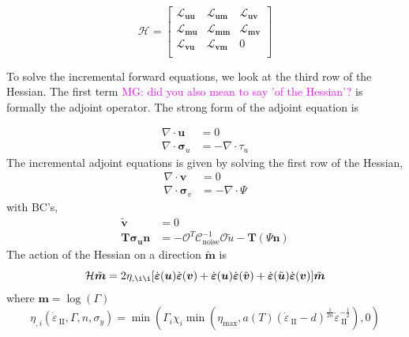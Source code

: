 \documentclass[12pt]{article}
\newcommand{\mgnote}[1]{\textcolor{magenta}{MG: #1}}
\newcommand{\IIinv}{{\dot\varepsilon}_{\mathrm{\!\!\:II}}}
\newcommand{\mm}{{\ensuremath{\boldsymbol{m}}}}
\newcommand{\uu}{{\ensuremath{\boldsymbol{u}}}}
\newcommand{\vv}{{\ensuremath{\boldsymbol{v}}}}
\newcommand{\ssigma}{{\ensuremath{\boldsymbol{\sigma}}}}
\newcommand{\strain}{{\ensuremath{\dot{\boldsymbol{\varepsilon}}}}}
\begin{document}
\begin{equation}
\mathcal{H} = 
\begin{bmatrix}
\mathcal{L}_{\uu\uu} & \mathcal{L}_{\uu\mm} & \mathcal{L}_{\uu\vv} \\
\mathcal{L}_{\mm\uu} & \mathcal{L}_{\mm\mm} & \mathcal{L}_{\mm\vv} \\
\mathcal{L}_{\vv\uu} & \mathcal{L}_{\vv\mm} & 0 \\
\end{bmatrix}
\end{equation}


To solve the incremental forward equations, we look at the third row of the Hessian. The first term \mgnote{did you also mean to say 'of the Hessian'?} is formally the adjoint operator. The strong form of the adjoint equation is 

\begin{equation}
\begin{split}
\nabla \cdot \uu &= 0 \\
\nabla \cdot \ssigma_u & = -\nabla \cdot \tau_u
\end{split}
\end{equation}
The incremental adjoint equations is given by solving the first row of the Hessian,
\begin{equation}
\begin{split}
\nabla \cdot \vv & = 0\\
\nabla \cdot \ssigma_v & = -\nabla \cdot \Psi 
\end{split}
\end{equation}
with BC's,
\begin{equation}
\begin{split}
\tilde{\vv}&=0 \\
\textbf{T}\ssigma_\uu\textbf{n}&= -\mathcal O^T\mathcal C^{-1}_{\text{noise}}\mathcal O \tilde{u}-\textbf{T}(\Psi\textbf{n})
\end{split}
\end{equation}
The action of the Hessian on a direction $\tilde{\mm}$ is
\begin{equation}
\mathcal H\tilde{\mm}= 2\eta_{,\i\i}[\strain(\uu)\strain(\vv) + \strain(\uu)\strain(\tilde{\vv}) + \strain(\tilde{\uu})\strain(\vv)]\tilde{\mm}
\end{equation}
 where $\mm = \log(\Gamma)$
\begin{equation}
  \label{eq:gamma}
\eta_{,i}(\IIinv,\Gamma,n,\sigma_y) = \min(\Gamma_i\chi_i\min(\eta_{\max},a(T)(\IIinv-d)^{\frac{1}{2n}}\IIinv^{-\frac{1}{2}}),0) 
\end{equation}
\end{document}
